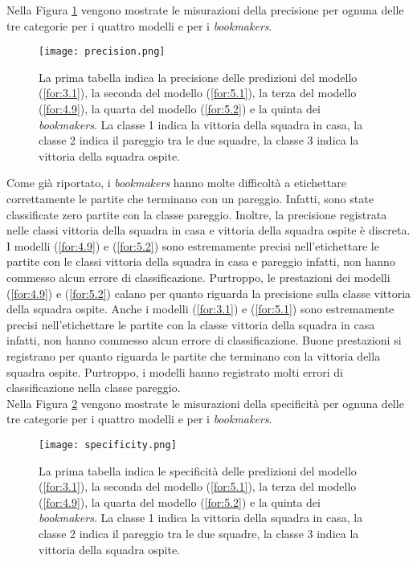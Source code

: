 Nella Figura \ref{fig:precision} vengono mostrate le misurazioni della precisione per ognuna delle tre categorie per i quattro modelli e per i \emph{bookmakers}.
\begin{figure}[]
	\begin{center}
		\texttt{[image: precision.png]}
		\caption{La prima tabella indica la precisione delle predizioni del modello (\ref{for:3.1}), la seconda del modello (\ref{for:5.1}), la terza del modello (\ref{for:4.9}), la quarta del modello (\ref{for:5.2}) e la quinta dei \emph{bookmakers}. La classe 1 indica la vittoria della squadra in casa, la classe 2 indica il pareggio tra le due squadre, la classe 3 indica la vittoria della squadra ospite.}\label{fig:precision}
	\end{center}
\end{figure}
Come già riportato, i \emph{bookmakers} hanno molte difficoltà a etichettare correttamente le partite che terminano con un pareggio. Infatti, sono state classificate zero partite con la classe pareggio. Inoltre, la precisione registrata nelle classi vittoria della squadra in casa e vittoria della squadra ospite è discreta. I modelli (\ref{for:4.9}) e (\ref{for:5.2})
sono estremamente precisi nell'etichettare le partite con le classi vittoria della squadra in casa e pareggio infatti, non hanno commesso alcun errore di classificazione. Purtroppo, le prestazioni dei modelli (\ref{for:4.9}) e (\ref{for:5.2}) calano per quanto riguarda la precisione sulla classe vittoria della squadra ospite. Anche i modelli (\ref{for:3.1}) e (\ref{for:5.1}) sono estremamente precisi nell'etichettare le partite con la classe vittoria della squadra in casa infatti, non hanno commesso alcun errore di classificazione. Buone prestazioni si registrano per quanto riguarda le partite che terminano con la vittoria della squadra ospite. Purtroppo, i modelli hanno registrato molti errori di classificazione nella classe pareggio.\\ 
Nella Figura \ref{fig:speci} vengono mostrate le misurazioni della specificità per ognuna delle tre categorie per i quattro modelli e per i \emph{bookmakers}.\\
\begin{figure}[]
	\begin{center}
		\texttt{[image: specificity.png]}
		\caption{La prima tabella indica le specificità delle predizioni del modello (\ref{for:3.1}), la seconda del modello (\ref{for:5.1}), la terza del modello (\ref{for:4.9}), la quarta del modello (\ref{for:5.2}) e la quinta dei \emph{bookmakers}. La classe 1 indica la vittoria della squadra in casa, la classe 2 indica il pareggio tra le due squadre, la classe 3 indica la vittoria della squadra ospite.}\label{fig:speci}
	\end{center}
\end{figure}

